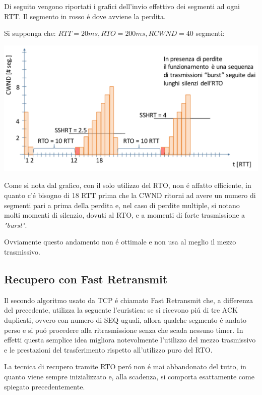 \documentclass[12pt]{article}
\begin{document}
Di seguito vengono riportati i grafici dell'invio effettivo dei segmenti ad ogni RTT. Il segmento in rosso \'e dove 
avviene la perdita. 

Si supponga che: $RTT=20ms, RTO=200ms, RCWND=40$ segmenti:
\begin{center}
	\includegraphics[scale=0.35]{livello_trasporto-img11.png}
\end{center}
Come si nota dal grafico, con il solo utilizzo del RTO, non \'e affatto efficiente, in quanto c'\'e bisogno di 18 RTT
prima che la CWND ritorni ad avere un numero di segmenti pari a prima della perdita e, nel caso di perdite multiple, 
si notano molti momenti di silenzio, dovuti al RTO, e a momenti di forte trasmissione a \textit{"burst"}.

Ovviamente questo andamento non \'e ottimale e non usa al meglio il mezzo trasmissivo.

\clearpage
\subsection{Recupero con Fast Retransmit}\label{recupero-delle-perdite-fast-retransmit}
Il secondo algoritmo usato da TCP \'e chiamato Fast Retransmit che, a differenza del precedente, utilizza
la seguente l'euristica: se si ricevono pi\'u di tre ACK duplicati, ovvero con numero di SEQ uguali, allora qualche 
segmento \'e andato perso e si pu\'o procedere alla ritrasmissione senza che scada nessuno timer. In effetti questa 
semplice idea migliora notevolmente l'utilizzo del mezzo trasmissivo e le prestazioni del trasferimento rispetto 
all'utilizzo puro del RTO.

La tecnica di recupero tramite RTO per\'o non \'e mai abbandonato del tutto, in quanto viene sempre inizializzato e, 
alla scadenza, si comporta esattamente come spiegato precedentemente.
\end{document}
